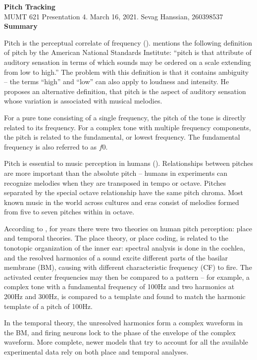 \documentclass[letter,11pt]{report}
\begin{document}
\noindent\LARGE{\textbf{Pitch Tracking}}\\
\Large{MUMT 621 Presentation 4. March 16, 2021. Sevag Hanssian, 260398537}\\

\noindent\Large{\textbf{Summary}}

Pitch is the perceptual correlate of frequency (\cite{plack}). \textcite{plack} mentions the following definition of pitch by the American National Standards Institute: ``pitch is that attribute of auditory sensation in terms of which sounds may be ordered on a scale extending from low to high.'' The problem with this definition is that it contains ambiguity -- the terms ``high'' and ``low'' can also apply to loudness and intensity. He proposes an alternative definition, that pitch is the aspect of auditory sensation whose variation is associated with musical melodies.

For a pure tone consisting of a single frequency, the pitch of the tone is directly related to its frequency. For a complex tone with multiple frequency components, the pitch is related to the fundamental, or lowest frequency. The fundamental frequency is also referred to as $\mathit{f0}$.

Pitch is essential to music perception in humans (\cite{musicevo}). Relationships between pitches are more important than the absolute pitch -- humans in experiments can recognize melodies when they are transposed in tempo or octave. Pitches separated by the special octave relationship have the same pitch chroma. Most known music in the world across cultures and eras consist of melodies formed from five to seven pitches within in octave.

According to \textcite{moore}, for years there were two theories on human pitch perception: place and temporal theories. The place theory, or place coding, is related to the tonotopic organization of the inner ear: spectral analysis is done in the cochlea, and the resolved harmonics of a sound excite different parts of the basilar membrane (BM), causing with different characteristic frequency (CF) to fire. The activated center frequencies may then be compared to a pattern -- for example, a complex tone with a fundamental frequency of 100Hz and two harmonics at 200Hz and 300Hz, is compared to a template and found to match the harmonic template of a pitch of 100Hz.

In the temporal theory, the unresolved harmonics form a complex waveform in the BM, and firing neurons lock to the phase of the envelope of the complex waveform. More complete, newer models that try to account for all the available experimental data rely on both place and temporal analyses.
\end{document}
